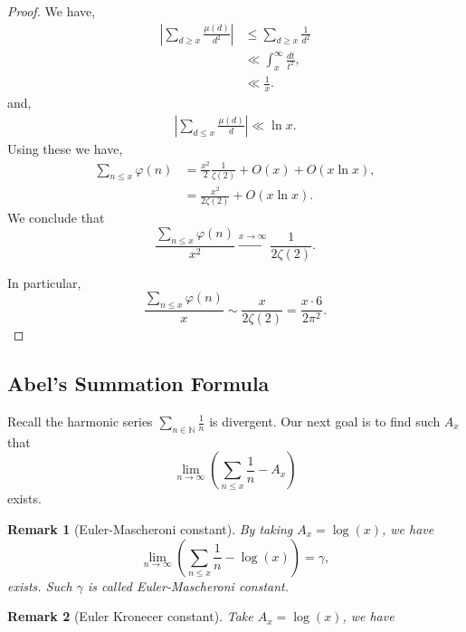 \documentclass{article}
\newtheorem{remark}{Remark}[section]
\newcommand{\N}[0]{\mathbb{N}}
\begin{document}
\begin{proof}
We have,
\begin{align*}
  \left\vert\sum_{d\geq x}{\frac {\mu(d)} {d^2}}\right\vert & \leq \sum_{d\geq x}{\frac 1 {d^2}}\\
  & \ll  \int_x^\infty {\frac {dt} {t^2}},\\
  & \ll  {\frac 1 x}.
\end{align*}
and,
\begin{align*}
  \left\vert\sum_{d\leq x}{\frac {\mu(d)} d}\right\vert \ll  \ln x.
\end{align*}
Using these we have,
\begin{align*}
  \sum_{n\leq x} \varphi(n)& = {\frac {x^2} 2}{\frac 1 {\zeta(2)}}+O(x) + O(x\ln x),\\
  & = {\frac {x^2} {2\zeta(2)}}+O(x\ln x).
\end{align*}
We conclude that 
\begin{equation*}
   {\frac {\sum_{n\leq x} \varphi(n)} {x^2}}\stackrel{x\to \infty}{\to} {\frac 1 {2\zeta(2)}}.
\end{equation*}

In particular,
\begin{equation*}
  {\frac {\sum_{n\leq x}\varphi(n)} {x}}\sim {\frac x {2\zeta(2)}} = {\frac {x \cdot 6}{2\pi^2} }.
\end{equation*}
\end{proof}



\subsection{Abel's Summation Formula}
Recall the harmonic series $\sum_{n\in\N}{\frac 1 n}$ is divergent. Our next goal is to find such $A_x$ that 
\begin{equation*}
  \lim_{n\to \infty}\left(\sum_{n\leq x}{\frac 1 n}-A_x\right)
\end{equation*}
exists. 


\begin{remark}[Euler-Mascheroni constant]
  By taking $A_x=\log(x)$, we have
  \begin{equation*}
    \lim_{n\to\infty}\left(\sum_{n\leq x}{\frac 1 n}-\log(x)\right) =\gamma,
  \end{equation*}
  exists. Such $\gamma$ is called Euler-Mascheroni constant.
\end{remark}

\begin{remark}[Euler Kronecer constant]
  Take $A_x = \log(x)$, we have %
\end{remark}
\end{document}

